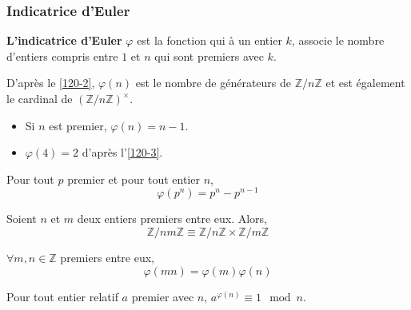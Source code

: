   \subsubsection{Indicatrice d'Euler}


  \begin{definition}
    \textbf{L'indicatrice d'Euler} $\varphi$ est la fonction qui à un entier $k$, associe le nombre d'entiers compris entre $1$ et $n$ qui sont premiers avec $k$.
  \end{definition}

  \begin{remark}
    D'après le \cref{120-2}, $\varphi(n)$ est le nombre de générateurs de $\mathbb{Z}/n\mathbb{Z}$ et est également le cardinal de $(\mathbb{Z}/n\mathbb{Z})^\times$.
  \end{remark}

  \begin{example}
    \begin{itemize}
      \item Si $n$ est premier, $\varphi(n) = n-1$.
      \item $\varphi(4) = 2$ d'après l'\cref{120-3}.
    \end{itemize}
  \end{example}


  \begin{proposition}
    Pour tout $p$ premier et pour tout entier $n$,
    \[ \varphi(p^n) = p^n - p^{n-1} \]
  \end{proposition}


  \begin{theorem}[Chinois]
    \label{120-4}
    Soient $n$ et $m$ deux entiers premiers entre eux. Alors,
    \[ \mathbb{Z}/nm\mathbb{Z} \equiv \mathbb{Z}/n\mathbb{Z} \times \mathbb{Z}/m\mathbb{Z} \]
  \end{theorem}

  \begin{corollary}
    $\forall m, n \in \mathbb{Z}$ premiers entre eux,
    \[ \varphi(mn) = \varphi(m)\varphi(n) \]
  \end{corollary}

  \begin{proposition}
    Pour tout entier relatif $a$ premier avec $n$, $a^{\varphi(n)} \equiv 1 \mod n$.
  \end{proposition}

